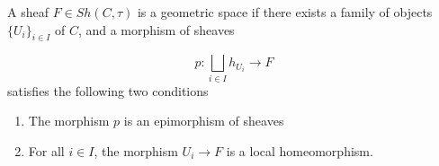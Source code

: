 \documentclass[../main.tex]{subfiles}
\begin{document}
\begin{defn}
    A sheaf $F \in Sh(C, \tau)$ is a geometric space if there exists a family of objects $\{U_i\}_{i \in I}$ of $C$, and a morphism of sheaves

    \[
        p: \bigsqcup_{i \in I} h_{U_i} \to F
    \]
    satisfies the following two conditions

    \begin{enumerate}
        \item The morphism $p$ is an epimorphism of sheaves
        \item For all $i\in I$, the morphism $U_i \to F$ is a local homeomorphism.
    \end{enumerate}
\end{defn}
\end{document}
